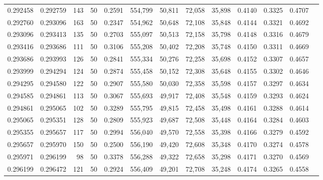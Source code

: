 \begin{tabular}{rrrrrrrrrrrrr}
0.292458 & 0.292759 &   143 &  50 &                                     0.2591 & 554,799 &  50,811 &  72,058 &  35,898 & 0.4140 & 0.3325 & 0.4707 \\
0.292760 & 0.293096 &   163 &  50 &                                     0.2347 & 554,962 &  50,648 &  72,108 &  35,848 & 0.4144 & 0.3321 & 0.4692 \\
0.293096 & 0.293413 &   135 &  50 &                                     0.2703 & 555,097 &  50,513 &  72,158 &  35,798 & 0.4148 & 0.3316 & 0.4679 \\
0.293416 & 0.293686 &   111 &  50 &                                     0.3106 & 555,208 &  50,402 &  72,208 &  35,748 & 0.4150 & 0.3311 & 0.4669 \\
0.293686 & 0.293993 &   126 &  50 &                                     0.2841 & 555,334 &  50,276 &  72,258 &  35,698 & 0.4152 & 0.3307 & 0.4657 \\
0.293999 & 0.294294 &   124 &  50 &                                     0.2874 & 555,458 &  50,152 &  72,308 &  35,648 & 0.4155 & 0.3302 & 0.4646 \\
0.294295 & 0.294580 &   122 &  50 &                                     0.2907 & 555,580 &  50,030 &  72,358 &  35,598 & 0.4157 & 0.3297 & 0.4634 \\
0.294585 & 0.294861 &   113 &  50 &                                     0.3067 & 555,693 &  49,917 &  72,408 &  35,548 & 0.4159 & 0.3293 & 0.4624 \\
0.294861 & 0.295065 &   102 &  50 &                                     0.3289 & 555,795 &  49,815 &  72,458 &  35,498 & 0.4161 & 0.3288 & 0.4614 \\
0.295065 & 0.295351 &   128 &  50 &                                     0.2809 & 555,923 &  49,687 &  72,508 &  35,448 & 0.4164 & 0.3284 & 0.4603 \\
0.295355 & 0.295657 &   117 &  50 &                                     0.2994 & 556,040 &  49,570 &  72,558 &  35,398 & 0.4166 & 0.3279 & 0.4592 \\
0.295657 & 0.295970 &   150 &  50 &                                     0.2500 & 556,190 &  49,420 &  72,608 &  35,348 & 0.4170 & 0.3274 & 0.4578 \\
0.295971 & 0.296199 &    98 &  50 &                                     0.3378 & 556,288 &  49,322 &  72,658 &  35,298 & 0.4171 & 0.3270 & 0.4569 \\
0.296199 & 0.296472 &   121 &  50 &                                     0.2924 & 556,409 &  49,201 &  72,708 &  35,248 & 0.4174 & 0.3265 & 0.4558 \\

\end{tabular}
